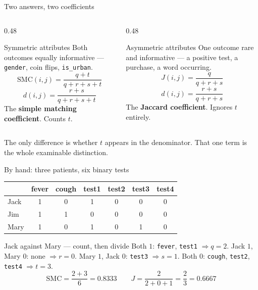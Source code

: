 \documentclass[aspectratio=169]{beamer}
\begin{document}
\begin{frame}[shrink=11]{Two answers, two coefficients}
  \begin{columns}[T]
    \begin{column}{0.48\textwidth}
      \begin{exampleblock}{Symmetric attributes}
        Both outcomes equally informative --- \texttt{gender}, coin flips,
        \texttt{is\_urban}.
        \[ \mathrm{SMC}(i,j) = \frac{q+t}{q+r+s+t} \]
        \[ d(i,j) = \frac{r+s}{q+r+s+t} \]
        \small The \textbf{simple matching coefficient}. Counts $t$.
      \end{exampleblock}
    \end{column}
    \begin{column}{0.48\textwidth}
      \begin{exampleblock}{Asymmetric attributes}
        One outcome rare and informative --- a positive test, a purchase, a
        word occurring.
        \[ J(i,j) = \frac{q}{q+r+s} \]
        \[ d(i,j) = \frac{r+s}{q+r+s} \]
        \small The \textbf{Jaccard coefficient}. Ignores $t$ entirely.
      \end{exampleblock}
    \end{column}
  \end{columns}
  \begin{center}
    \small The only difference is whether $t$ appears in the denominator.
    That one term is the whole examinable distinction.
  \end{center}
\end{frame}

\begin{frame}{By hand: three patients, six binary tests}
  \begin{center}
    \small
    \begin{tabular}{lcccccc}
      \toprule
      & fever & cough & test1 & test2 & test3 & test4 \\
      \midrule
      Jack & 1 & 0 & 1 & 0 & 0 & 0 \\
      Jim  & 1 & 1 & 0 & 0 & 0 & 0 \\
      Mary & 1 & 0 & 1 & 0 & 1 & 0 \\
      \bottomrule
    \end{tabular}
  \end{center}
  \vspace{0.3em}
  \begin{exampleblock}{Jack against Mary --- count, then divide}
    Both $1$: \texttt{fever}, \texttt{test1} $\Rightarrow q = 2$. \quad
    Jack $1$, Mary $0$: none $\Rightarrow r = 0$. \quad
    Mary $1$, Jack $0$: \texttt{test3} $\Rightarrow s = 1$. \quad
    Both $0$: \texttt{cough}, \texttt{test2}, \texttt{test4}
    $\Rightarrow t = 3$.
    \[
      \mathrm{SMC} = \frac{2+3}{6} = 0.8333
      \qquad
      J = \frac{2}{2+0+1} = \frac{2}{3} = 0.6667
    \]
  \end{exampleblock}
\end{frame}
\end{document}

